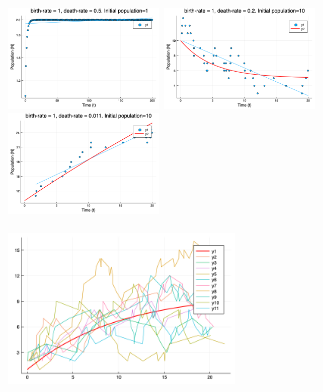 \documentclass[10pt, usenames, dvipsnames, xcolor=table]{beamer}
\begin{document}
\begin{frame}
\begin{figure}[h]
\includegraphics[width=4cm]{1_05_1}
\includegraphics[width=4cm]{1_02_10}
\includegraphics[width=4cm]{1_001_10}
\end{figure}
\begin{figure}[h]
\includegraphics[width=6cm]{1_01_1_multiple}
\end{figure}
\end{frame}
\end{document}
